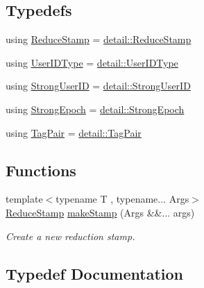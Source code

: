 \subsection*{Typedefs}
\begin{DoxyCompactItemize}
\item 
using \hyperlink{namespacevt_1_1collective_1_1reduce_a7b7cb3021ac5654d92825d9fab0250b2}{Reduce\+Stamp} = \hyperlink{namespacevt_1_1collective_1_1reduce_1_1detail_aacc1fcd729d934ba143fee3a943bf9e7}{detail\+::\+Reduce\+Stamp}
\item 
using \hyperlink{namespacevt_1_1collective_1_1reduce_a6cdf1adaf7aedc9df00c92fe55cdcecd}{User\+I\+D\+Type} = \hyperlink{namespacevt_1_1collective_1_1reduce_1_1detail_ae82d7b96b0885b9b7dfb0104398beead}{detail\+::\+User\+I\+D\+Type}
\item 
using \hyperlink{namespacevt_1_1collective_1_1reduce_a49e47347201b1b0fdb552ed4b7c86331}{Strong\+User\+ID} = \hyperlink{namespacevt_1_1collective_1_1reduce_1_1detail_af9e42b20d1be7dccc1b5e587f0387e02}{detail\+::\+Strong\+User\+ID}
\item 
using \hyperlink{namespacevt_1_1collective_1_1reduce_a0b5fbe1e89aea537d76fda4c57f2099e}{Strong\+Epoch} = \hyperlink{namespacevt_1_1collective_1_1reduce_1_1detail_ad6739d14b8ee41189f785355708748fc}{detail\+::\+Strong\+Epoch}
\item 
using \hyperlink{namespacevt_1_1collective_1_1reduce_ae3111ccd7e2214f079222e4c016b6652}{Tag\+Pair} = \hyperlink{structvt_1_1collective_1_1reduce_1_1detail_1_1_tag_pair}{detail\+::\+Tag\+Pair}
\end{DoxyCompactItemize}
\subsection*{Functions}
\begin{DoxyCompactItemize}
\item 
{\footnotesize template$<$typename T , typename... Args$>$ }\\\hyperlink{namespacevt_1_1collective_1_1reduce_a7b7cb3021ac5654d92825d9fab0250b2}{Reduce\+Stamp} \hyperlink{namespacevt_1_1collective_1_1reduce_a16bd926f0a7f318a75d2bf921b516db3}{make\+Stamp} (Args \&\&... args)
\begin{DoxyCompactList}\small\item\em Create a new reduction stamp. \end{DoxyCompactList}\end{DoxyCompactItemize}


\subsection{Typedef Documentation}
\mbox{\label{namespacevt_1_1collective_1_1reduce_a7b7cb3021ac5654d92825d9fab0250b2}} 
